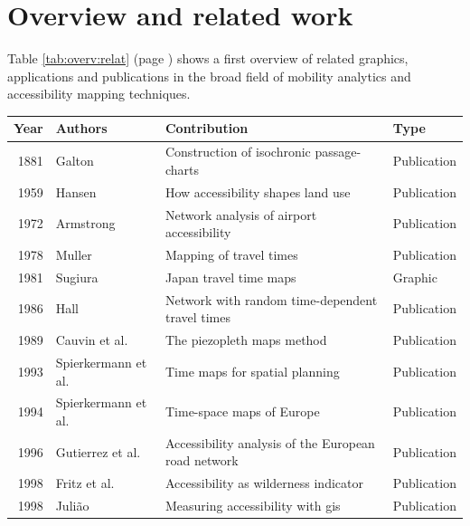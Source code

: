 
\cleardoublepage
\chapter{Overview and related work}
  \label{chap:overv}

  Table \ref{tab:overv:relat} (page \pageref{tab:overv:relat}) shows a first
  overview of related graphics, applications and publications in the broad
  field of mobility analytics and accessibility mapping techniques.\par

  \begin{table}[htp]
    \tiny \centering
    \begin{tabular}{r|l|l|l}
     \textbf{Year} & \textbf{Authors} & \textbf{Contribution} & \textbf{Type} \\
     \hline
      1881 & Galton \cite{galton1881construction} & Construction of isochronic passage-charts & Publication \\
      1959 & Hansen \cite{hansen1959accessibility} & How accessibility shapes land use & Publication \\
      1972 & Armstrong \cite{armstrong1972network} & Network analysis of airport accessibility & Publication \\
      1978 & Muller \cite{muller1978mapping} & Mapping of travel times & Publication \\
      1981 & Sugiura \cite{Sugiura1981} & Japan travel time maps & Graphic \\
      1986 & Hall \cite{hall1986fastest} & Network with random time-dependent travel times & Publication \\
      1989 & Cauvin et al. \cite{cauvin1989cartographic} & The piezopleth maps method & Publication \\
      1993 & Spierkermann et al. \cite{spiekermann1993zeitkarten} & Time maps for spatial planning & Publication \\
      1994 & Spierkermann et al. \cite{spiekermann1994new} & Time-space maps of Europe & Publication \\
      1996 & Gutierrez et al. \cite{gutierrez1996accessibility} & Accessibility analysis of the European road network & Publication \\
      1998 & Fritz et al. \cite{fritz1998accessibility} & Accessibility as wilderness indicator & Publication \\
      1998 & Juli{\~a}o \cite{juliao1998measuring} & Measuring accessibility with \acrshort{gis} & Publication \\

\end{tabular}
\end{table}
